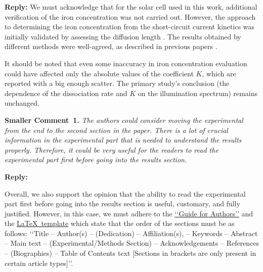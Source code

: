 \documentclass{WileyMSP-template}
\begin{document}
\noindent
\textcolor[rgb]{0.51,0.00,0.00}{\textbf{Reply:}}
We must acknowledge that for the solar cell used in this work, additional verification of the iron concentration was not carried out.
However, the approach to determining the iron concentration from the short-circuit current kinetics 
was initially validated by assessing the diffusion length \cite{FeB_Zong}.
The results obtained by different methods were well-agreed, as described in previous papers \cite{Olikh2021JAP,Olikh2022:JMatSci}.

It should be noted that even some inaccuracy in iron concentration evaluation could have affected only 
the absolute values of the coefficient $K$, which are reported \cite{FeBLight2,FeBAssJAP2014,FeBKin2019} with a big enough scatter.
The primary study's conclusion (the dependence of the dissociation rate and $K$ on the illumination spectrum) remains unchanged.




\vspace{1cm}
\noindent
\textcolor[rgb]{0.00,0.50,1.00}{\textbf{Smaller Comment~1.}}
\emph{The authors could consider moving the experimental from the end to the second section in the paper.
There is a lot of crucial information in the experimental part that is needed to understand the results properly.
Therefore, it could be very useful for the readers to read the experimental part first before going into the results section.}

\noindent
\textcolor[rgb]{0.51,0.00,0.00}{\textbf{Reply:}}

Overall, we also support the opinion that the ability to read the experimental part first
before going into the results section is useful, customary, and fully justified.
However, in this case, we must adhere to the
\href{https://onlinelibrary.wiley.com/page/journal/18626319/homepage/author-guidelines}{‘‘Guide for Authors’’}
and the
\href{https://onlinelibrary.wiley.com/pb-assets/assets/vch/msp/LaTeX-template-1593698612150.zip}{\LaTeX~template}
which state that the order of the sections must be as follows:
‘‘Title -- Author(s) -- (Dedication) -- Affiliation(s), -- Keywords --
Abstract -- Main text -- (Experimental/Methods Section) -- Acknowledgements -- References -- (Biographies) -- Table of Contents text
 [Sections in brackets are only present in certain article types]’’.
\end{document}
